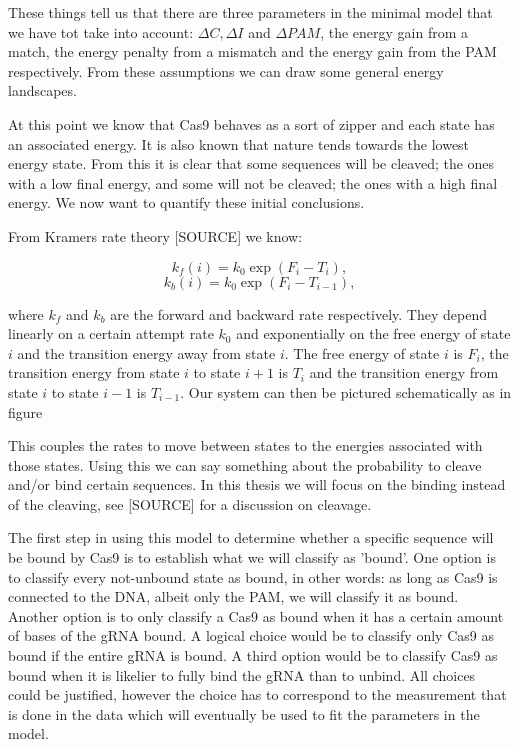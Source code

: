 These things tell us that there are three parameters in the minimal model that we have tot take into account: $\Delta C, \Delta I$ and $\Delta PAM$, the energy gain from a match, the energy penalty from a mismatch and the energy gain from the PAM respectively. From these assumptions we can draw some general energy landscapes.


At this point we know that Cas9 behaves as a sort of zipper and each state has an associated energy. It is also known that nature tends towards the lowest energy state. From this it is clear that some sequences will be cleaved; the ones with a low final energy, and some will not be cleaved; the ones with a high final energy. We now want to quantify these initial conclusions.

From Kramers rate theory [SOURCE] we know:

\begin{equation}
k_f(i) = k_0 \exp{(F_i-T_i)},
\end{equation}
\begin{equation}
k_b(i) = k_0 \exp{(F_i-T_{i-1})},
\end{equation}

where $k_f$ and $k_b$ are the forward and backward rate respectively. They depend linearly on a certain attempt rate $k_0$ and exponentially on the free energy of state $i$ and the transition energy away from state $i$. The free energy of state $i$ is $F_i$, the transition energy from state $i$ to state $i+1$ is $T_i$ and the transition energy from state $i$ to state $i-1$ is $T_{i-1}$. Our system can then be pictured schematically as in figure %


This couples the rates to move between states to the energies associated with those states. Using this we can say something about the probability to cleave and/or bind certain sequences. In this thesis we will focus on the binding instead of the cleaving, see [SOURCE] for a discussion on cleavage.

The first step in using this model to determine whether a specific sequence will be bound by Cas9 is to establish what we will classify as 'bound'. One option is to classify every not-unbound state as bound, in other words: as long as Cas9 is connected to the DNA, albeit only the PAM, we will classify it as bound. Another option is to only classify a Cas9 as bound when it has a certain amount of bases of the gRNA bound. A logical choice would be to classify only Cas9 as bound if the entire gRNA is bound. A third option would be to classify Cas9 as bound when it is likelier to fully bind the gRNA than to unbind. All choices could be justified, however the choice has to correspond to the measurement that is done in the data which will eventually be used to fit the parameters in the model.


